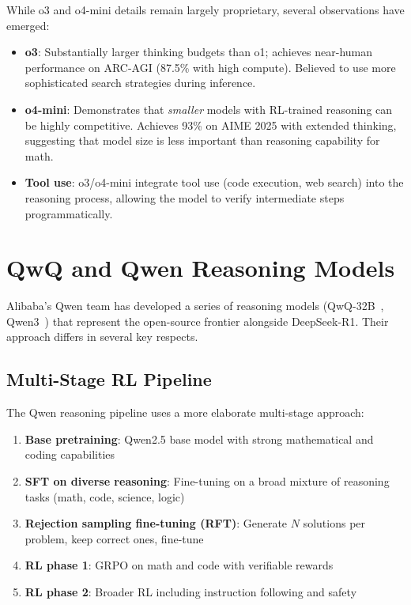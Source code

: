 While o3 and o4-mini details remain largely proprietary, several observations have emerged:

\begin{itemize}
  \item \textbf{o3}: Substantially larger thinking budgets than o1; achieves near-human performance on ARC-AGI (87.5\% with high compute). Believed to use more sophisticated search strategies during inference.
  \item \textbf{o4-mini}: Demonstrates that \emph{smaller} models with RL-trained reasoning can be highly competitive. Achieves 93\% on AIME 2025 with extended thinking, suggesting that model size is less important than reasoning capability for math.
  \item \textbf{Tool use}: o3/o4-mini integrate tool use (code execution, web search) into the reasoning process, allowing the model to verify intermediate steps programmatically.
\end{itemize}

\section{QwQ and Qwen Reasoning Models}
\label{subsec:qwq_qwen}

Alibaba’s Qwen team has developed a series of reasoning models (QwQ-32B~\cite{qwen2024qwq}, Qwen3~\cite{qwen2025qwen3}) that represent the open-source frontier alongside DeepSeek-R1. Their approach differs in several key respects.

\subsection{Multi-Stage RL Pipeline}
\label{multi-stage-rl-pipeline}

The Qwen reasoning pipeline uses a more elaborate multi-stage approach:

\begin{enumerate}
  \item \textbf{Base pretraining}: Qwen2.5 base model with strong mathematical and coding capabilities
  \item \textbf{SFT on diverse reasoning}: Fine-tuning on a broad mixture of reasoning tasks (math, code, science, logic)
  \item \textbf{Rejection sampling fine-tuning (RFT)}: Generate $N$ solutions per problem, keep correct ones, fine-tune
  \item \textbf{RL phase 1}: GRPO on math and code with verifiable rewards
  \item \textbf{RL phase 2}: Broader RL including instruction following and safety
\end{enumerate}


